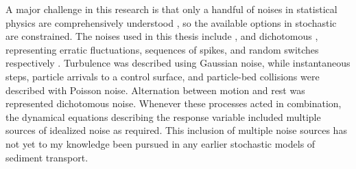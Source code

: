A major challenge in this research is that only a handful of noises in statistical physics are comprehensively understood \citep{Horsthemke1984}, so the available options in stochastic \DIFdelbegin {}\DIFdelend \DIFaddbegin {}\DIFaddend are constrained.
The noises used in this thesis include \DIFdelbegin {}\DIFdelend \DIFaddbegin {}\DIFaddend , and dichotomous \DIFdelbegin {}\DIFdelend \DIFaddbegin {}\DIFaddend , representing erratic fluctuations, sequences of spikes, and random switches respectively \citep{VanDenBroeck1983}.
Turbulence was described using Gaussian \DIFaddbegin {}\DIFaddend noise, while instantaneous steps, particle arrivals to a control surface, and particle-bed collisions were described with Poisson noise. Alternation between motion and rest was represented \DIFdelbegin {}\DIFdelend \DIFaddbegin {}\DIFaddend dichotomous noise.
Whenever these processes acted in combination, the dynamical equations describing the response variable included multiple sources of idealized noise as required.
This inclusion of multiple noise sources has not yet to my knowledge been pursued in any earlier stochastic models of sediment transport.

